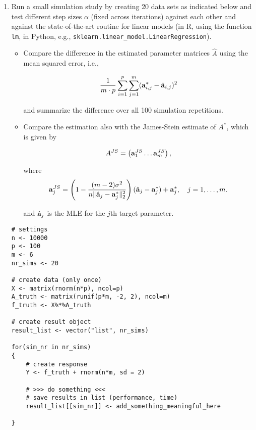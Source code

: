 \documentclass[a4paper]{article}
\begin{document}
{\begin{enumerate}
\begin{lstlisting}
#' @param step_size the step_size in each iteration
#' @param X the feature input matrix X
#' @param Y the score matrix Y
#' @param A a starting value for the parameter matrix
#' @param eps a small constant measuring the changes in each update step.
#' Stop the algorithm if the estimated model parameters do not change
#' more than \textbackslash{}code\{eps\}.
#' @return a parameter matrix A
gradient_descent <- function(step_size, X, Y, A, eps=1e-8){
    # >>> do something <<<
    return(A)
}
\end{lstlisting}

\emph{Hint:} You have computed the gradient in (a).

\item Run a small simulation study by creating 20 data sets as indicated below and test different step sizes $\alpha$ (fixed across iterations) against each other and against the state-of-the-art routine for linear models (in R, using the function \texttt{lm}, in Python, e.g., \texttt{sklearn.linear\_model.LinearRegression}).

\begin{itemize}
    \item Compare the difference in the estimated parameter matrices $\hat A$ using the mean squared error, i.e., 

    $$ \frac{1}{m\cdot p} \sum_{i=1}^p \sum_{j=1}^m (\mathbf{a}^{*}_{i,j}-\hat{\mathbf{a}}_{i,j})^2$$ 

    and summarize the difference over all 100 simulation repetitions.
   
    \item Compare the estimation also with the James-Stein estimate of $A^*$, which is given by 
  
	$$  A^{JS} = \left(  \mathbf{a}_1^{JS} \ldots \mathbf{a}_m^{JS}  \right),$$

	where $$  \mathbf{a}_j^{JS} = \left (1 - \frac{(m-2)\sigma^2}{n\|\hat{\mathbf{a}}_j - \mathbf{a}_j^* \|^2_2} \right )  (\hat{\mathbf{a}}_j - \mathbf{a}_j^*) + \mathbf{a}_j^*, \quad j=1,\ldots,m.$$

	and $\hat{\mathbf{a}}_j$ is the MLE for the $j$th target parameter.
 
\end{itemize}

\begin{lstlisting}
# settings
n <- 10000
p <- 100
m <- 6
nr_sims <- 20

# create data (only once)
X <- matrix(rnorm(n*p), ncol=p)
A_truth <- matrix(runif(p*m, -2, 2), ncol=m)
f_truth <- X%*%A_truth

# create result object
result_list <- vector("list", nr_sims)

for(sim_nr in nr_sims)
{
    # create response
    Y <- f_truth + rnorm(n*m, sd = 2)

    # >>> do something <<<
    # save results in list (performance, time)
    result_list[[sim_nr]] <- add_something_meaningful_here

}
\end{lstlisting}

\end{enumerate}
} 
\end{document}
